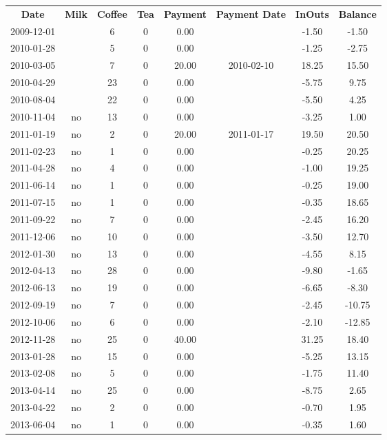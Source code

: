 \begin{center}
\begin{tabular}{cccccccc}
\textbf{Date} & \textbf{Milk} & \textbf{Coffee} & \textbf{Tea} & \textbf{Payment} & \textbf{Payment Date} & \textbf{InOuts} & \textbf{Balance} \\
2009-12-01 &  &  6 & 0 &  0.00 &  & -1.50 &  -1.50\\ 
2010-01-28 &  &  5 & 0 &  0.00 &  & -1.25 &  -2.75\\ 
2010-03-05 &  &  7 & 0 & 20.00 & 2010-02-10 & 18.25 &  15.50\\ 
2010-04-29 &  & 23 & 0 &  0.00 &  & -5.75 &   9.75\\ 
2010-08-04 &  & 22 & 0 &  0.00 &  & -5.50 &   4.25\\ 
2010-11-04 & no & 13 & 0 &  0.00 &  & -3.25 &   1.00\\ 
2011-01-19 & no &  2 & 0 & 20.00 & 2011-01-17 & 19.50 &  20.50\\ 
2011-02-23 & no &  1 & 0 &  0.00 &  & -0.25 &  20.25\\ 
2011-04-28 & no &  4 & 0 &  0.00 &  & -1.00 &  19.25\\ 
2011-06-14 & no &  1 & 0 &  0.00 &  & -0.25 &  19.00\\ 
2011-07-15 & no &  1 & 0 &  0.00 &  & -0.35 &  18.65\\ 
2011-09-22 & no &  7 & 0 &  0.00 &  & -2.45 &  16.20\\ 
2011-12-06 & no & 10 & 0 &  0.00 &  & -3.50 &  12.70\\ 
2012-01-30 & no & 13 & 0 &  0.00 &  & -4.55 &   8.15\\ 
2012-04-13 & no & 28 & 0 &  0.00 &  & -9.80 &  -1.65\\ 
2012-06-13 & no & 19 & 0 &  0.00 &  & -6.65 &  -8.30\\ 
2012-09-19 & no &  7 & 0 &  0.00 &  & -2.45 & -10.75\\ 
2012-10-06 & no &  6 & 0 &  0.00 &  & -2.10 & -12.85\\ 
2012-11-28 & no & 25 & 0 & 40.00 &  & 31.25 &  18.40\\ 
2013-01-28 & no & 15 & 0 &  0.00 &  & -5.25 &  13.15\\ 
2013-02-08 & no &  5 & 0 &  0.00 &  & -1.75 &  11.40\\ 
2013-04-14 & no & 25 & 0 &  0.00 &  & -8.75 &   2.65\\ 
2013-04-22 & no &  2 & 0 &  0.00 &  & -0.70 &   1.95\\ 
2013-06-04 & no &  1 & 0 &  0.00 &  & -0.35 &   1.60
\end{tabular}
\end{center}

